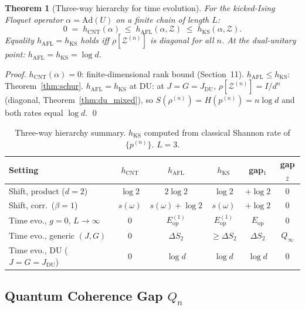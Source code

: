 \documentclass[12pt,a4paper]{article}
\newtheorem{theorem}{Theorem}[section]
\begin{document}
\begin{theorem}[Three-way hierarchy for time evolution]
\label{thm:time_hierarchy}
For the kicked-Ising Floquet operator $\alpha=\mathrm{Ad}(U)$ on a finite chain of
length $L$:
\[
  0 \;=\; h_{\mathrm{CNT}}(\alpha)
  \;\leq\; h_{\mathrm{AFL}}(\alpha,\mathcal{Z})
  \;\leq\; h_{\mathrm{KS}}(\alpha,\mathcal{Z}).
\]
Equality $h_{\mathrm{AFL}}=h_{\mathrm{KS}}$ holds iff $\rho[\mathcal{Z}^{(n)}]$ is
diagonal for all $n$.  At the dual-unitary point: $h_{\mathrm{AFL}}=h_{\mathrm{KS}}=\log d$.
\end{theorem}

\begin{proof}
$h_{\mathrm{CNT}}(\alpha)=0$: finite-dimensional rank bound (Section~11).
$h_{\mathrm{AFL}}\leq h_{\mathrm{KS}}$: Theorem~\ref{thm:schur}.
$h_{\mathrm{AFL}}=h_{\mathrm{KS}}$ at DU: at $J=G=J_\mathrm{DU}$,
$\rho[\mathcal{Z}^{(n)}]=I/d^n$ (diagonal, Theorem~\ref{thm:du_mixed}),
so $S(\rho^{(n)})=H(p^{(n)})=n\log d$ and both rates equal $\log d$.  \qed
\end{proof}

\begin{table}[h!]
\centering
\caption{Three-way hierarchy summary.  $h_{\mathrm{KS}}$ computed from classical
Shannon rate of $\{p^{(n)}\}$.  $L=3$.}
\label{tab:hierarchy}
\begin{tabular}{l|c|c|c|c|c}
Setting & $h_{\mathrm{CNT}}$ & $h_{\mathrm{AFL}}$ & $h_{\mathrm{KS}}$ & gap$_1$ & gap$_2$\\
\hline
Shift, product ($d=2$) & $\log 2$ & $2\log 2$ & $\log 2$ & $+\log 2$ & $0$\\
Shift, corr.\ ($\beta=1$) & $s(\omega)$ & $s(\omega){+}\log 2$ & $s(\omega)$ & $+\log 2$ & $0$\\
Time evo., $g=0$, $L\to\infty$ & $0$ & $E_{\mathrm{op}}^{(1)}$ & $E_{\mathrm{op}}^{(1)}$ & $E_{\mathrm{op}}$ & $0$\\
Time evo., generic $(J,G)$ & $0$ & $\Delta S_2$ & $\geq\Delta S_2$ & $\Delta S_2$ & $Q_\infty$\\
Time evo., DU ($J{=}G{=}J_\mathrm{DU}$) & $0$ & $\log d$ & $\log d$ & $\log d$ & $0$\\
\end{tabular}
\end{table}

\subsection{Quantum Coherence Gap $Q_n$}
\label{sec:coherence_gap}
\end{document}
